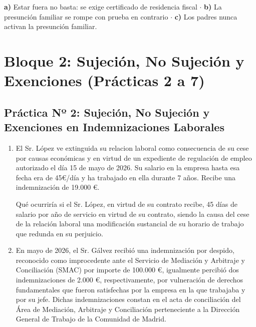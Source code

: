 \documentclass[11pt,a4paper,openany]{article}
\begin{document}
\begin{resultadoBox}
\textbf{a)} Estar fuera no basta: se exige certificado de residencia fiscal $\cdot$ \textbf{b)} La presunción familiar se rompe con prueba en contrario $\cdot$ \textbf{c)} Los padres nunca activan la presunción familiar.
\end{resultadoBox}

\vspace{0.4cm}

\section{Bloque 2: Sujeción, No Sujeción y Exenciones (Prácticas 2 a 7)}

\subsection{Práctica Nº 2: Sujeción, No Sujeción y Exenciones en Indemnizaciones Laborales}

\begin{enunciadoBox}
\begin{enumerate}[label=\textbf{\arabic*.}]
    \item El Sr. López ve extinguida su relacion laboral como consecuencia de su cese por causas económicas y en virtud de un expediente de regulación de empleo autorizado el día 15 de mayo de 2026. Su salario en la empresa hasta esa fecha era de 45\euro{}/día y ha trabajado en ella durante 7 años. Recibe una indemnización de 19.000 \euro{}.
    
    Qué ocurriría si el Sr. López, en virtud de su contrato recibe, 45 días de salario por año de servicio en virtud de su contrato, siendo la causa del cese de la relación laboral una modificación sustancial de su horario de trabajo que redunda en su perjuicio.
    
    \item En mayo de 2026, el Sr. Gálvez recibió una indemnización por despido, reconocido como improcedente ante el Servicio de Mediación y Arbitraje y Conciliación (SMAC) por importe de 100.000 \euro{}, igualmente percibió dos indemnizaciones de 2.000 \euro{}, respectivamente, por vulneración de derechos fundamentales que fueron satisfechas por la empresa en la que trabajaba y por su jefe. Dichas indemnizaciones constan en el acta de conciliación del Área de Mediación, Arbitraje y Conciliación perteneciente a la Dirección General de Trabajo de la Comunidad de Madrid.
\end{enumerate}
\end{enunciadoBox}
\end{document}
